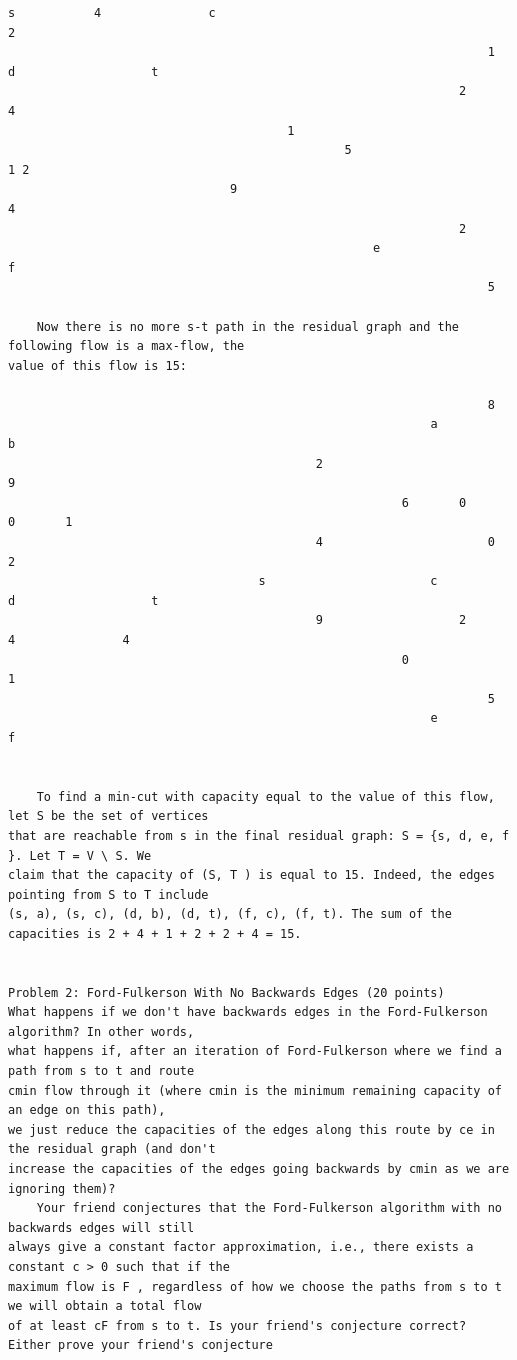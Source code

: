 \documentclass[12pt]{article}
\begin{document}
\begin{Verbatim}[breaklines=true,fontsize=\small]
                       s           4               c                                           2
                                                                   1               d                   t
                                                               2       4
                                       1
                                               5                               1 2
                               9                                                                   4
                                                               2
                                                   e                               f
                                                                   5

    Now there is no more s-t path in the residual graph and the following flow is a max-flow, the
value of this flow is 15:

                                                                   8
                                                           a               b
                                           2                                           9
                                                       6       0       0       1
                                           4                       0                   2
                                   s                       c               d                   t
                                           9                   2       4               4
                                                       0                       1
                                                                   5
                                                           e               f


    To find a min-cut with capacity equal to the value of this flow, let S be the set of vertices
that are reachable from s in the final residual graph: S = {s, d, e, f }. Let T = V \ S. We
claim that the capacity of (S, T ) is equal to 15. Indeed, the edges pointing from S to T include
(s, a), (s, c), (d, b), (d, t), (f, c), (f, t). The sum of the capacities is 2 + 4 + 1 + 2 + 2 + 4 = 15.


Problem 2: Ford-Fulkerson With No Backwards Edges (20 points)
What happens if we don't have backwards edges in the Ford-Fulkerson algorithm? In other words,
what happens if, after an iteration of Ford-Fulkerson where we find a path from s to t and route
cmin flow through it (where cmin is the minimum remaining capacity of an edge on this path),
we just reduce the capacities of the edges along this route by ce in the residual graph (and don't
increase the capacities of the edges going backwards by cmin as we are ignoring them)?
    Your friend conjectures that the Ford-Fulkerson algorithm with no backwards edges will still
always give a constant factor approximation, i.e., there exists a constant c > 0 such that if the
maximum flow is F , regardless of how we choose the paths from s to t we will obtain a total flow
of at least cF from s to t. Is your friend's conjecture correct? Either prove your friend's conjecture


\end{Verbatim}
\end{document}
